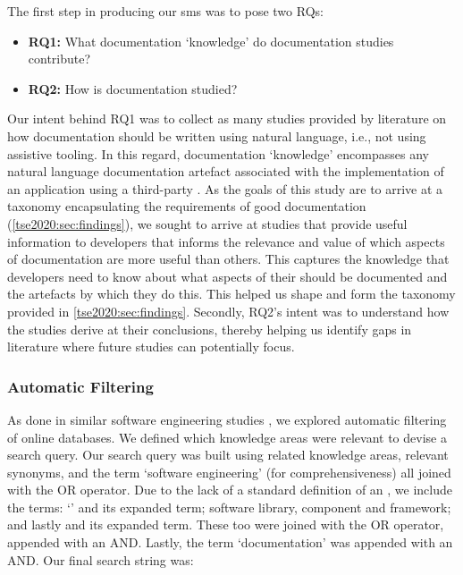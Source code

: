 The first step in producing our \gls{sms} was to pose two RQs:
\begin{itemize}[leftmargin=\parindent]
  \item \textbf{RQ1:} What documentation `knowledge' do  documentation studies contribute?
  \item \textbf{RQ2:} How is  documentation studied?
\end{itemize}
Our intent behind RQ1 was to collect as many studies provided by literature on how  documentation should be written using natural language, i.e., not using assistive tooling. In this regard, documentation `knowledge' encompasses any natural language  documentation artefact associated with the implementation of an application using a third-party . As the goals of this study are to arrive at a taxonomy encapsulating the requirements of good  documentation (\cref{tse2020:sec:findings}), we sought to arrive at studies that provide useful information to developers that informs the relevance and value of which aspects of  documentation are more useful than others. This captures the knowledge that developers need to know about what aspects of their  should be documented and the artefacts by which they do this. This helped us shape and form the taxonomy provided in \cref{tse2020:sec:findings}. Secondly, RQ2's intent was to understand how the studies derive at their conclusions, thereby helping us identify gaps in literature where future studies can potentially focus.


\subsubsection{Automatic Filtering}

As done in similar software engineering studies \citep{Glass:2002wa,Usman:2017hn,GAROUSI2019101}, we explored  automatic filtering of online databases. We defined which  knowledge areas \citep{IEEE:1990wp} were relevant to devise a search query. Our search query was built using related knowledge areas, relevant synonyms, and the term `software engineering' (for comprehensiveness) all joined with the OR operator. Due to the lack of a standard definition of an , we include the terms: `' and its expanded term; software library, component and framework; and lastly  and its expanded term. These too were joined with the OR operator, appended with an AND. Lastly, the term `documentation' was appended with an AND.
Our final search string was:

